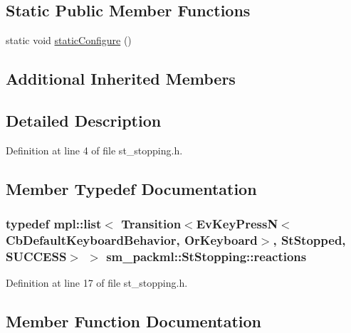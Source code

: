 \subsection*{Static Public Member Functions}
\begin{DoxyCompactItemize}
\item 
static void \hyperlink{structsm__packml_1_1StStopping_aad0f6b6783a0f883b8fc71c01bfb4ab1}{static\+Configure} ()
\end{DoxyCompactItemize}
\subsection*{Additional Inherited Members}


\subsection{Detailed Description}


Definition at line 4 of file st\+\_\+stopping.\+h.



\subsection{Member Typedef Documentation}
\subsubsection[{\texorpdfstring{reactions}{reactions}}]{\setlength{\rightskip}{0pt plus 5cm}typedef mpl\+::list$<$ Transition$<$Ev\+Key\+PressN$<$Cb\+Default\+Keyboard\+Behavior, {\bf Or\+Keyboard}$>$, {\bf St\+Stopped}, {\bf S\+U\+C\+C\+E\+SS}$>$ $>$ {\bf sm\+\_\+packml\+::\+St\+Stopping\+::reactions}}\hypertarget{structsm__packml_1_1StStopping_a436a5a5334e71657c558b693f90c7029}{}\label{structsm__packml_1_1StStopping_a436a5a5334e71657c558b693f90c7029}


Definition at line 17 of file st\+\_\+stopping.\+h.



\subsection{Member Function Documentation}
